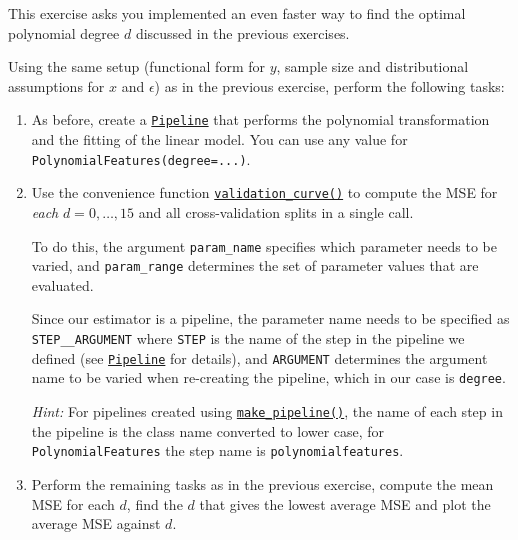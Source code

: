 \documentclass{scrartcl}
\begin{document}
This exercise asks you implemented an even faster way to find the
optimal polynomial degree \(d\) discussed in the previous exercises.

Using the same setup (functional form for \(y\), sample size and
distributional assumptions for \(x\) and \(\epsilon\)) as in the
previous exercise, perform the following tasks:

\begin{enumerate}
\def\labelenumi{\arabic{enumi}.}
\item
  As before, create a
  \href{https://scikit-learn.org/stable/modules/generated/sklearn.pipeline.Pipeline.html}{\texttt{Pipeline}}
  that performs the polynomial transformation and the fitting of the
  linear model. You can use any value for
  \texttt{PolynomialFeatures(degree=...)}.
\item
  Use the convenience function
  \href{https://scikit-learn.org/stable/modules/generated/sklearn.model_selection.validation_curve.html}{\texttt{validation\_curve()}}
  to compute the MSE for \emph{each} \(d = 0,\dots,15\) and all
  cross-validation splits in a single call.

  To do this, the argument \texttt{param\_name} specifies which
  parameter needs to be varied, and \texttt{param\_range} determines the
  set of parameter values that are evaluated.

  Since our estimator is a pipeline, the parameter name needs to be
  specified as
  \texttt{\textquotesingle{}STEP\_\_ARGUMENT\textquotesingle{}} where
  \texttt{STEP} is the name of the step in the pipeline we defined (see
  \href{https://scikit-learn.org/stable/modules/generated/sklearn.pipeline.Pipeline.html}{\texttt{Pipeline}}
  for details), and \texttt{ARGUMENT} determines the argument name to be
  varied when re-creating the pipeline, which in our case is
  \texttt{degree}.

  \emph{Hint:} For pipelines created using
  \href{https://scikit-learn.org/stable/modules/generated/sklearn.pipeline.make_pipeline.html}{\texttt{make\_pipeline()}},
  the name of each step in the pipeline is the class name converted to
  lower case, \ie for \texttt{PolynomialFeatures} the step name is
  \texttt{polynomialfeatures}.
\item
  Perform the remaining tasks as in the previous exercise, \ie compute
  the mean MSE for each \(d\), find the \(d\) that gives the lowest
  average MSE and plot the average MSE against \(d\).
\end{enumerate}
\end{document}
